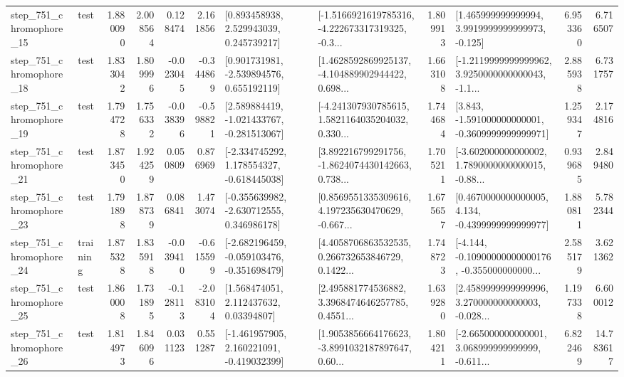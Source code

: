 \begin{tabular}{llrrrrllrlrr}
  step\_751\_chromophore\_15 &      test &      1.880090 &    2.008564 &      0.128474 &  2.161856 &     [0.893458938, 2.529943039, 0.245739217] &  [-1.5166921619785316, -4.222673317319325, -0.3... &       1.809913 &    [1.465999999999994, 3.9919999999999973, -0.125] &            6.953360 &          6.716507 \\
  step\_751\_chromophore\_18 &      test &      1.833042 &    1.809996 &     -0.023045 & -0.344869 &    [0.901731981, -2.539894576, 0.655192119] &  [1.4628592869925137, -4.104889902944422, 0.698... &       1.663108 &  [-1.2119999999999962, 3.9250000000000043, -1.1... &            2.885938 &          6.731757 \\
  step\_751\_chromophore\_19 &      test &      1.794728 &    1.756332 &     -0.038396 & -0.598821 &   [2.589884419, -1.021433767, -0.281513067] &  [-4.241307930785615, 1.5821164035204032, 0.330... &       1.744684 &   [3.843, -1.591000000000001, -0.3609999999999971] &            1.259347 &          2.174816 \\
  step\_751\_chromophore\_21 &      test &      1.873450 &    1.924259 &      0.050809 &  0.876969 &   [-2.334745292, 1.178554327, -0.618445038] &  [3.892216799291756, -1.8624074430142663, 0.738... &       1.705211 &  [-3.602000000000002, 1.7890000000000015, -0.88... &            0.939685 &          2.849480 \\
  step\_751\_chromophore\_23 &      test &      1.791898 &    1.878739 &      0.086841 &  1.473074 &   [-0.355639982, -2.630712555, 0.346986178] &  [0.8569551335309616, 4.197235630470629, -0.667... &       1.675657 &   [0.4670000000000005, 4.134, -0.4399999999999977] &            1.880811 &          5.782344 \\
  step\_751\_chromophore\_24 &  training &      1.875328 &    1.835918 &     -0.039410 & -0.615599 &  [-2.682196459, -0.059103476, -0.351698479] &  [4.4058706863532535, 0.266732653846729, 0.1422... &       1.748723 &  [-4.144, -0.10900000000000176, -0.355000000000... &            2.585179 &          3.621362 \\
  step\_751\_chromophore\_25 &      test &      1.860008 &    1.731895 &     -0.128113 & -2.083104 &      [1.568474051, 2.112437632, 0.03394807] &  [2.495881774536882, 3.3968474646257785, 0.4551... &       1.639280 &  [2.4589999999999996, 3.270000000000003, -0.028... &            1.197338 &          6.600012 \\
  step\_751\_chromophore\_26 &      test &      1.814973 &    1.846096 &      0.031123 &  0.551287 &   [-1.461957905, 2.160221091, -0.419032399] &  [1.9053856664176623, -3.8991032187897647, 0.60... &       1.804211 &  [-2.665000000000001, 3.068999999999999, -0.611... &            6.822469 &         14.783617 \\

\end{tabular}
